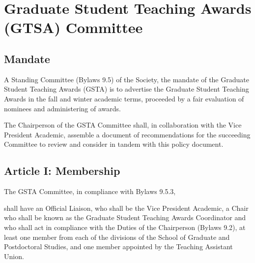 \section{Graduate Student Teaching Awards (GTSA) Committee}

\subsection{Mandate}
A Standing Committee (Bylaws 9.5) of the Society, the mandate of the Graduate Student Teaching Awards (GSTA) is to advertise the Graduate Student Teaching Awards in the fall and winter academic terms, proceeded by a fair evaluation of nominees and administering of awards.\newline 

The Chairperson of the GSTA Committee shall, in collaboration with the Vice President Academic, assemble a document of recommendations for the succeeding Committee to review and consider in tandem with this policy document. \newline

\subsection{Article I: Membership}   
\begin{longenum}[ label*=\thesubsection.\arabic*., align=left] 
\item The GSTA Committee, in compliance with Bylaws 9.5.3,
	\begin{longenum}[ label*=\arabic*., align=left]
	\item shall have an Official Liaison, who shall be the Vice President Academic, a Chair who shall be known as the Graduate Student Teaching Awards Coordinator and who shall act in compliance with the Duties of the Chairperson (Bylaws 9.2), at least one member from each of the divisions of the School of Graduate and Postdoctoral Studies, and one member appointed by the Teaching Assistant Union.
	\end{longenum}
\end{longenum}

